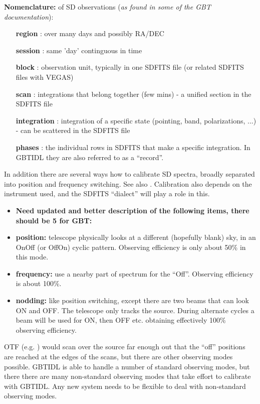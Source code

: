 \documentclass[12pt,a4paper]{article}
\begin{document}
\bigskip\noindent
{\bf Nomenclature:} of SD observations ({\it as found in some of the GBT documentation}):
    

\begin{itemize}[leftmargin=1in]
  \item[{\bf region}]  : over many days and possibly RA/DEC
  \item[{\bf session}] : same 'day' continguous in time
  \item[{\bf block}]   : observation unit, typically in one SDFITS file (or related SDFITS files with VEGAS)
  \item[{\bf scan}]    : integrations that belong together (few mins) - a unified section in the SDFITS file
  \item[{\bf integration}] : integration of a specific state (pointing, band, polarizations, ...) - can be scattered in the SDFITS file
  \item[{\bf phases}]    : the individual rows in SDFITS that make a specific integration.  In GBTIDL they are also
    referred to as a ``record''.
\end{itemize}   


In addition there are several ways how to calibrate SD spectra, broadly separated
into position and frequency switching. See also \cite{braatz2009}.
Calibration also depends on the instrument used,
and the SDFITS ``dialect'' will play a role in this. 

\begin{itemize}
\item
  {\bf Need updated and better description of the following items, there should be 5 for GBT:}
\item
  {\bf position:}   telescope physically looks at a different (hopefully blank) sky, in an OnOff (or OffOn) cyclic pattern.
  Observing efficiency is only about 50\% in this mode.
\item
{\bf frequency:}  use a nearby part of spectrum for the ``Off''. Observing efficiency is about 100\%.
\item
  {\bf nodding:} like position switching, except there are two beams
  that can look ON and OFF. The telescope only tracks the
  source. During alternate cycles a beam will be used for ON, then OFF
  etc. obtaining effectively 100\% observing efficiency.


\end{itemize}

OTF (e.g. \cite{2007AA...474..679M})
would scan over the source far enough out that the ``off'' positions are reached at
the edges of the scans, but there are other observing modes possible. GBTIDL is able to
handle a number of standard observing modes, but there there are many non-standard
observing modes that take effort to calibrate with GBTIDL.  Any new system needs to
be flexible to deal with non-standard observing modes.
\end{document}
